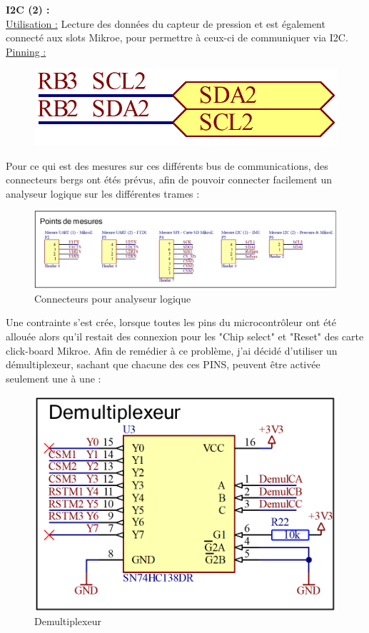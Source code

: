 {{		\textbf{I2C (2) :} \\
		\underline{Utilisation :} Lecture des données du capteur de pression et est également connecté aux slots Mikroe, pour permettre à ceux-ci de communiquer via I2C. \\
		\underline{Pinning :} \vspace{-6mm}
		\begin{figure}[h!]
			\centering
			\includegraphics[width=0.25\linewidth]{Figures/Dev-SCH/I2C2}
			\label{fig:i2c2}
		\end{figure}
	
		\clearpage
		Pour ce qui est des mesures sur ces différents bus de communications, des connecteurs bergs ont étés prévus, afin de pouvoir connecter facilement un analyseur logique sur les différentes trames : 
		
		\begin{figure}[h]
			\centering
			\includegraphics[width=0.9\linewidth]{Figures/Dev-SCH/PointsMesures}
			\caption{Connecteurs pour analyseur logique}
			\label{fig:pointsmesures}
		\end{figure}
		
		Une contrainte s'est crée, lorsque toutes les pins du microcontrôleur ont été allouée alors qu'il restait des connexion pour les "Chip select" et "Reset" des carte click-board Mikroe. Afin de remédier à ce problème, j'ai décidé d'utiliser un démultiplexeur, sachant que chacune des ces PINS, peuvent être activée seulement une à une : 
		
		\begin{figure}[h]
			\centering
			\includegraphics[width=0.6\linewidth]{Figures/Dev-SCH/Demultiplexeur}
			\caption{Demultiplexeur}
			\label{fig:demultiplexeur}
		\end{figure}
	}
	
}
